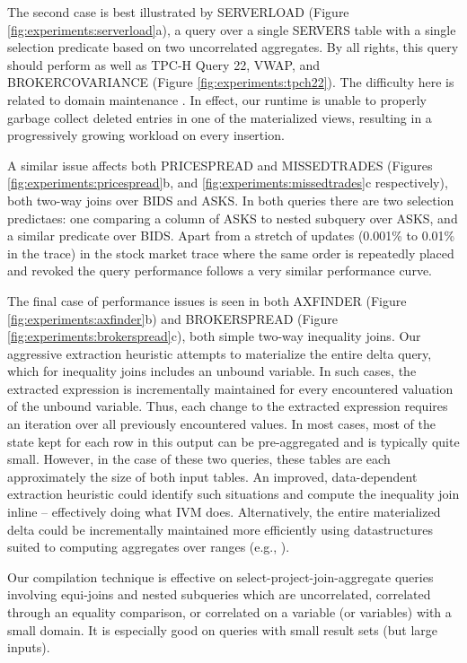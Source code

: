 The second case is best illustrated by SERVERLOAD (Figure \ref{fig:experiments:serverload}a), a query over a single SERVERS table with a single selection predicate based on two uncorrelated aggregates.  By all rights, this query should perform as well as TPC-H Query 22, VWAP, and BROKERCOVARIANCE (Figure \ref{fig:experiments:tpch22}).  The difficulty here is related to domain maintenance .  In effect, our runtime is unable to properly garbage collect deleted entries in one of the materialized views, resulting in a progressively growing workload on every insertion.  

A similar issue affects both PRICESPREAD and MISSEDTRADES (Figures \ref{fig:experiments:pricespread}b, and \ref{fig:experiments:missedtrades}c respectively), both two-way joins over BIDS and ASKS.  In both queries there are two selection predictaes: one comparing a column of ASKS to nested subquery over ASKS, and a similar predicate over BIDS.  Apart from a stretch of updates (0.001\% to 0.01\% in the trace) in the stock market trace where the same order is repeatedly placed and revoked the query performance follows a very similar performance curve. 

The final case of performance issues is seen in both AXFINDER (Figure \ref{fig:experiments:axfinder}b) and BROKERSPREAD (Figure \ref{fig:experiments:brokerspread}c), both simple two-way inequality joins.  Our aggressive extraction heuristic attempts to materialize the entire delta query, which for inequality joins includes an unbound variable.  In such cases, the extracted expression is incrementally maintained for every encountered valuation of the unbound variable.  Thus, each change to the extracted expression requires an iteration over all previously encountered values.  In most cases, most of the state kept for each row in this output can be pre-aggregated and is typically quite small.  However, in the case of these two queries, these tables are each approximately the size of both input tables.  An improved, data-dependent extraction heuristic could identify such situations and compute the inequality join inline -- effectively doing what IVM does.  Alternatively, the entire materialized delta could be incrementally maintained more efficiently using datastructures suited to computing aggregates over ranges (e.g., \cite{range trees}).

Our compilation technique is effective on select-project-join-aggregate queries involving equi-joins and nested subqueries which are uncorrelated, correlated through an equality comparison, or correlated on a variable (or variables) with a small domain.  It is especially good on queries with small result sets (but large inputs).

